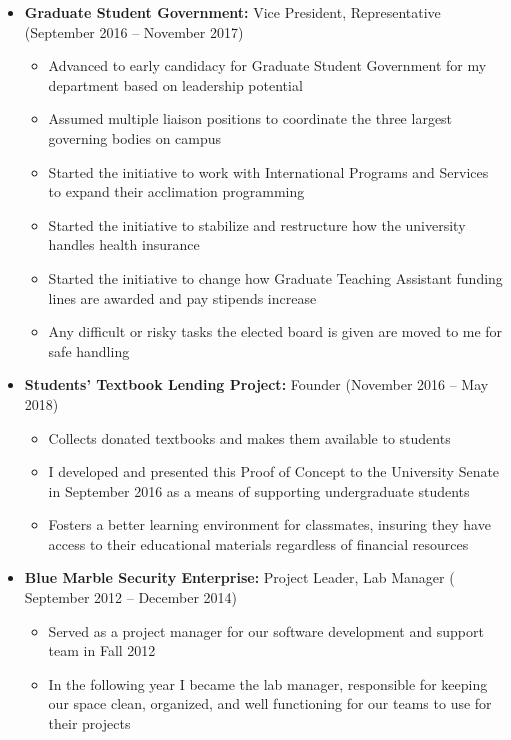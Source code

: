 \documentclass[11pt,a4paper,sans]{moderncv}        %
\begin{document}
\begin{itemize}

\item \textbf{Graduate Student Government:} Vice President, Representative (September 2016 -- November 2017)
\begin{itemize}
	\item Advanced to early candidacy for Graduate Student Government for my department based on leadership potential
	\item Assumed multiple liaison positions to coordinate the three largest governing bodies on campus
	\item Started the initiative to work with International Programs and Services to expand their acclimation programming
	\item Started the initiative to stabilize and restructure how the university handles health insurance
	\item Started the initiative to change how Graduate Teaching Assistant funding lines are awarded and pay stipends increase
	\item Any difficult or risky tasks the elected board is given are moved to me for safe handling
\end{itemize}

\vspace{6pt}

\item \textbf{Students' Textbook Lending Project:} Founder (November 2016 -- May 2018)
\begin{itemize}
	\item Collects donated textbooks and makes them available to students
	\item I developed and presented this Proof of Concept to the University Senate in September 2016 as a means of supporting undergraduate students
	\item Fosters a better learning environment for classmates, insuring they have access to their educational materials regardless of financial resources
\end{itemize}

\vspace{6pt}

\item \textbf{Blue Marble Security Enterprise:} Project Leader, Lab Manager ( September 2012 -- December 2014)
\begin{itemize}
	\item Served as a project manager for our software development and support team in Fall 2012
	\item In the following year I became the lab manager, responsible for keeping our space clean, organized, and well functioning for our teams to use for their projects
\end{itemize}

\end{itemize}
\end{document}
